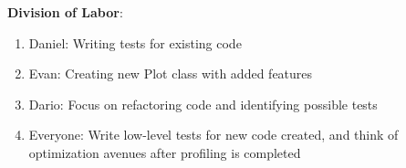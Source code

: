 \documentclass{article}
\begin{document}
\textbf{Division of Labor}:
\begin{enumerate}
\item Daniel: Writing tests for existing code
\item Evan: Creating new Plot class with added features
\item Dario: Focus on refactoring code and identifying possible tests
\item Everyone: Write low-level tests for new code created, and think of optimization avenues after profiling is completed
\end{enumerate}

\printbibliography
\end{document}
